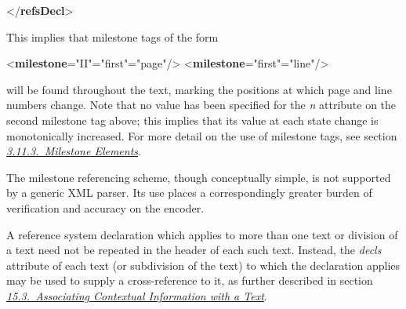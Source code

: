 \begin{shaded}
{</\textbf{refsDecl}>}\end{shaded}\egroup\par \noindent  This implies that milestone tags of the form \par\bgroup{}\exampleFont \begin{shaded}\noindent\mbox{}{<\textbf{milestone}\hspace*{1em}{n}="{II}"\hspace*{1em}{ed}="{first}"\hspace*{1em}{unit}="{page}"/>}\mbox{}\newline 
{<\textbf{milestone}\hspace*{1em}{ed}="{first}"\hspace*{1em}{unit}="{line}"/>}\end{shaded}\egroup\par \noindent  will be found throughout the text, marking the positions at which page and line numbers change. Note that no value has been specified for the {\itshape n} attribute on the second milestone tag above; this implies that its value at each state change is monotonically increased. For more detail on the use of milestone tags, see section \textit{\hyperref[CORS5]{3.11.3.\ Milestone Elements}}.  \par
The milestone referencing scheme, though conceptually simple, is not supported by a generic XML parser. Its use places a correspondingly greater burden of verification and accuracy on the encoder.\par
A reference system declaration which applies to more than one text or division of a text need not be repeated in the header of each such text. Instead, the {\itshape decls} attribute of each text (or subdivision of the text) to which the declaration applies may be used to supply a cross-reference to it, as further described in section \textit{\hyperref[CCAS]{15.3.\ Associating Contextual Information with a Text}}.
